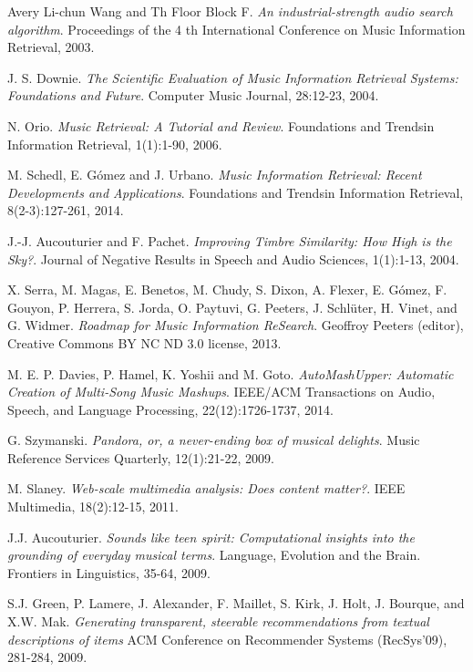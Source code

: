 \documentclass[11pt, oneside]{Thesis} %
\begin{document}
\begin{thebibliography}{99}
Avery Li-chun Wang and Th Floor Block F. 
\textit{An industrial-strength audio search algorithm}. 
Proceedings of the 4 th International Conference on Music Information Retrieval, 2003.
 
J. S. Downie.
\textit{The Scientific Evaluation of Music Information Retrieval Systems: Foundations and Future}. 
Computer Music Journal, 28:12-23, 2004.
 
N. Orio.
\textit{Music Retrieval: A Tutorial and Review}. 
Foundations and Trends\textregistered in Information Retrieval, 1(1):1-90, 2006.

M. Schedl, E. Gómez and J. Urbano.
\textit{Music Information Retrieval: Recent Developments and Applications}. 
Foundations and Trends\textregistered in Information Retrieval, 8(2-3):127-261, 2014.

J.-J. Aucouturier and F. Pachet.
\textit{Improving Timbre Similarity: How High is the Sky?}. 
Journal of Negative Results in Speech and Audio Sciences, 1(1):1-13, 2004.

X. Serra, M. Magas, E. Benetos, M. Chudy, S. Dixon, A. Flexer, E. Gómez, F. Gouyon, P. Herrera, S. Jorda, O. Paytuvi, G. Peeters, J. Schlüter, H. Vinet, and G. Widmer.
\textit{Roadmap for Music Information ReSearch}. 
Geoffroy Peeters (editor), Creative Commons BY NC ND 3.0 license, 2013.

M. E. P. Davies, P. Hamel, K. Yoshii and M. Goto.
\textit{AutoMashUpper: Automatic Creation of Multi-Song Music Mashups}. 
IEEE/ACM Transactions on Audio, Speech, and Language Processing, 22(12):1726-1737, 2014.

G. Szymanski.
\textit{Pandora, or, a never-ending box of musical delights}. 
Music Reference Services Quarterly, 12(1):21-22, 2009.

M. Slaney.
\textit{Web-scale multimedia analysis: Does content matter?}. 
IEEE Multimedia, 18(2):12-15, 2011.

J.J. Aucouturier.
\textit{Sounds like teen spirit: Computational insights into the grounding of everyday musical terms}. 
Language, Evolution and the Brain. Frontiers in Linguistics, 35-64, 2009.

S.J. Green, P. Lamere, J. Alexander, F. Maillet, S. Kirk, J. Holt, J. Bourque, and X.W. Mak.
\textit{Generating transparent, steerable recommendations from textual descriptions of items}
ACM Conference on Recommender Systems (RecSys'09), 281-284, 2009.

\end{thebibliography}


\end{document}
